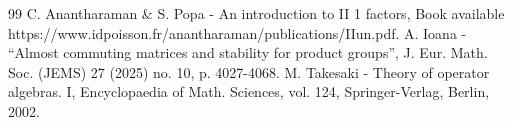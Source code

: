\begin{thebibliography}{99}
 C. Anantharaman \& S. Popa - An introduction to II 1 factors, Book available https://www.idpoisson.fr/anantharaman/publications/IIun.pdf.
 A. Ioana - “Almost commuting matrices and stability for product groups”, J. Eur. Math. Soc. (JEMS) 27 (2025) no. 10, p. 4027-4068.
 M. Takesaki - Theory of operator algebras. I, Encyclopaedia of Math. Sciences, vol. 124, Springer-Verlag, Berlin, 2002.
\end{thebibliography}
